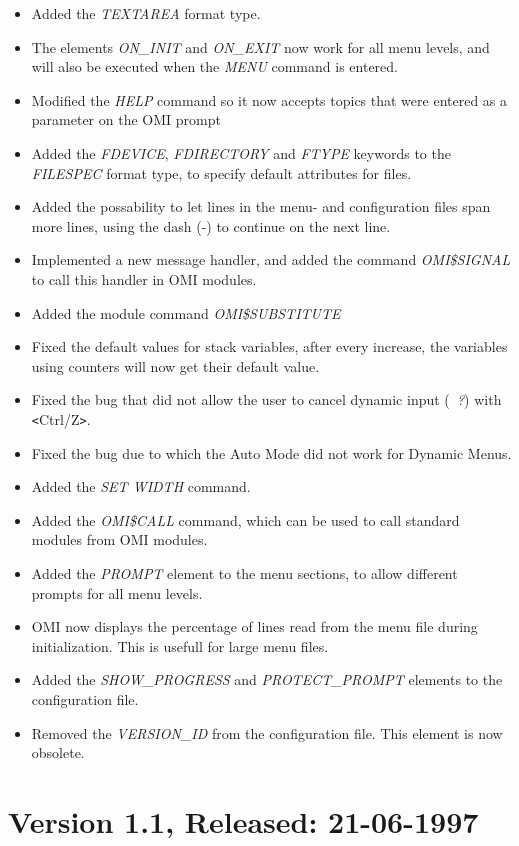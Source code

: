 \documentclass[a4paper]{book}
\newcommand{\lt}{\texttt{<}}
\newcommand{\gt}{\texttt{>}}
\begin{document}
\begin{itemize}
\item Added the \textsl{TEXTAREA} format type.
\item The elements \textsl{ON{\_}INIT} and \textsl{ON{\_}EXIT} now work for all menu levels, and will also be executed when the \textsl{MENU} command is entered.
\item Modified the \textsl{HELP} command so it now accepts topics that were entered as a parameter on the OMI prompt
\item Added the \textsl{FDEVICE}, \textsl{FDIRECTORY} and \textsl{FTYPE} keywords to the \textsl{FILESPEC} format type, to specify default attributes for files.
\item Added the possability to let lines in the menu- and configuration files span more lines, using the dash (-) to continue on the next line.
\item Implemented a new message handler, and added the command \textsl{OMI{\$}SIGNAL} to call this handler in OMI modules.
\item Added the module command \textsl{OMI{\$}SUBSTITUTE}
\item Fixed the default values for stack variables, after every increase, the variables using counters will now get their default value.
\item Fixed the bug that did not allow the user to cancel dynamic input (\textsl{~?}) with \lt Ctrl/Z\gt.
\item Fixed the bug due to which the Auto Mode did not work for Dynamic Menus.
\item Added the \textsl{SET WIDTH} command.
\item Added the \textsl{OMI{\$}CALL} command, which can be used to call standard modules from OMI modules.
\item Added the \textsl{PROMPT} element to the menu sections, to allow different prompts for all menu levels.
\item OMI now displays the percentage of lines read from the menu file during initialization. This is usefull for large menu files.
\item Added the \textsl{SHOW{\_}PROGRESS} and \textsl{PROTECT{\_}PROMPT} elements to the configuration file.
\item Removed the \textsl{VERSION{\_}ID} from the configuration file. This element is now obsolete.
\end{itemize}

\section*{Version 1.1, Released: 21-06-1997}
\end{document}
